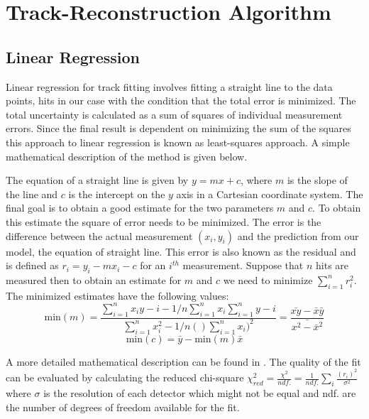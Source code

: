 \section{Track-Reconstruction Algorithm}

\subsection{Linear Regression}
\label{sec:Linear_Regression}
Linear regression for track fitting involves fitting a straight line to the data points, hits in our case with the condition that the total error is minimized. The total uncertainty is calculated as a sum of squares of individual measurement errors. Since the final result is dependent on minimizing the sum of the squares this approach to linear regression is known as least-squares approach. A simple mathematical description of the method is given below.

The equation of a straight line is given by $y=mx + c$, where $m$ is the slope of the line and $c$ is the intercept on the $y$ axis in a Cartesian coordinate system. The final goal is to obtain a good estimate for the two parameters $m$ and $c$. To obtain this estimate the square of error needs to be minimized. The error is the difference between the actual measurement $(x_i,y_i)$ and the prediction from our model, the equation of straight line. This error is also known as the residual and is defined as $r_i = y_i - m x_i - c $ for an $i^{th}$ measurement. Suppose that $n$ hits are measured then to obtain an estimate for $m$ and $c$ we need to minimize $\sum_{i=1}^n r_i^2$. The minimized estimates have the following values:
\begin{equation}
      \text{min}(m) = \frac{\sum_{i=1}^n x_i y-i - 1/n \sum_{i=1}^n x_i \sum_{i=1}^n y-i}{\sum_{i=1}^n x_i^2 - 1/n ()\sum_{i=1}^n x_i)^2}  = \frac{\bar{xy} - \bar{x}\bar{y}}{\bar{x^2-\bar{x}^2}}
\end{equation}
\begin{equation}
      \text{min}(c) = \bar{y} - \text{min}(m) \bar{x}
\end{equation}

A more detailed mathematical description can be found in \cite{Linear_regression}. The quality of the fit can be evaluated by calculating the reduced chi-square $\chi^2_{red}=\frac{\chi^2}{ndf.}=\frac{1}{ndf.}\sum_i \frac{(r_i)^2}{\sigma^2}$ where $\sigma$ is the resolution of each detector which might not be equal and ndf. are the number of degrees of freedom available for the fit.

